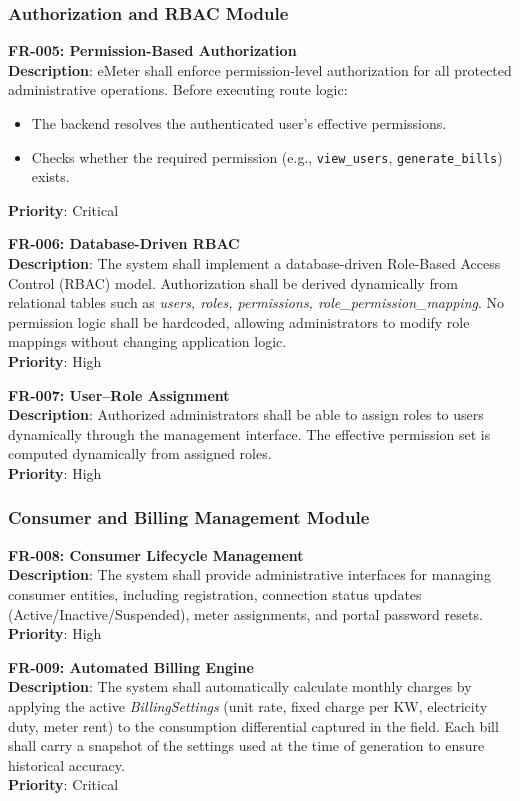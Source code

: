 \documentclass[12pt, a4paper, onecolumn]{report}
\begin{document}
\subsubsection{Authorization and RBAC Module}

\textbf{FR-005: Permission-Based Authorization} \\
\textbf{Description}: eMeter shall enforce permission-level authorization for all protected administrative operations. Before executing route logic:
\begin{itemize}
    \item The backend resolves the authenticated user's effective permissions.
    \item Checks whether the required permission (e.g., \texttt{view\_users}, \texttt{generate\_bills}) exists.
\end{itemize}
\textbf{Priority}: Critical

\textbf{FR-006: Database-Driven RBAC} \\
\textbf{Description}: The system shall implement a database-driven Role-Based Access Control (RBAC) model. Authorization shall be derived dynamically from relational tables such as \textit{users, roles, permissions, role\_permission\_mapping}. No permission logic shall be hardcoded, allowing administrators to modify role mappings without changing application logic. \\
\textbf{Priority}: High

\textbf{FR-007: User--Role Assignment} \\
\textbf{Description}: Authorized administrators shall be able to assign roles to users dynamically through the management interface. The effective permission set is computed dynamically from assigned roles. \\
\textbf{Priority}: High

\subsubsection{Consumer and Billing Management Module}

\textbf{FR-008: Consumer Lifecycle Management} \\
\textbf{Description}: The system shall provide administrative interfaces for managing consumer entities, including registration, connection status updates (Active/Inactive/Suspended), meter assignments, and portal password resets. \\
\textbf{Priority}: High

\textbf{FR-009: Automated Billing Engine} \\
\textbf{Description}: The system shall automatically calculate monthly charges by applying the active \textit{BillingSettings} (unit rate, fixed charge per KW, electricity duty, meter rent) to the consumption differential captured in the field. Each bill shall carry a snapshot of the settings used at the time of generation to ensure historical accuracy. \\
\textbf{Priority}: Critical
\end{document}
